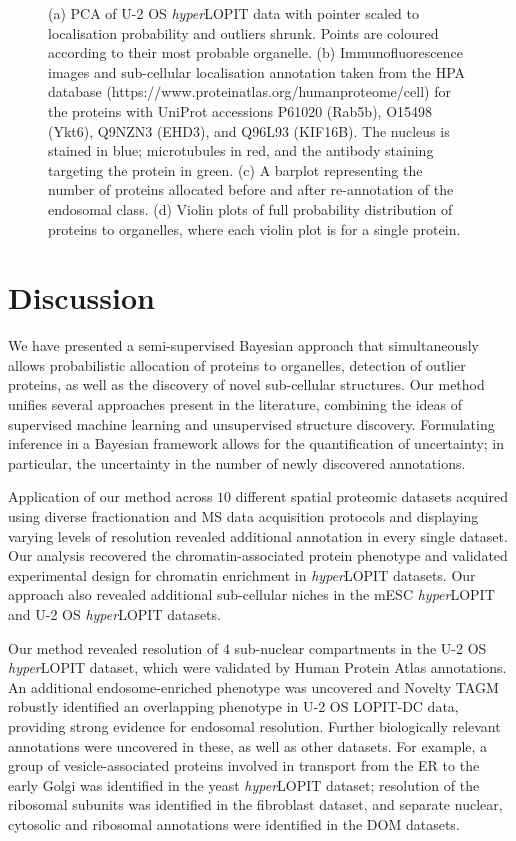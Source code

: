 \documentclass[12pt,english]{article}
\begin{document}
\begin{figure}[h]
\begin{subfigure}[t]{1\textwidth}
		\caption{}
	\end{subfigure}
	\caption{(a) PCA of U-2 OS \textit{hyper}LOPIT data with pointer scaled to localisation probability and outliers shrunk. Points are coloured according to their most probable organelle. (b) Immunofluorescence images and sub-cellular localisation annotation taken from the HPA database (https://www.proteinatlas.org/humanproteome/cell) for the proteins with UniProt accessions P61020 (Rab5b), O15498 (Ykt6), Q9NZN3 (EHD3), and Q96L93 (KIF16B). The nucleus is stained in blue; microtubules in red, and the antibody staining targeting the protein in green. (c) A barplot representing the number of proteins allocated before and after re-annotation of the endosomal class. (d) Violin plots of full probability distribution of proteins to organelles, where each violin plot is for a single protein.
	}
	\label{figure:u2os}
\end{figure}
\clearpage 
\section{Discussion}
We have presented a semi-supervised Bayesian approach that simultaneously allows probabilistic allocation of proteins to organelles, detection of outlier proteins, as well as the discovery of novel sub-cellular structures. Our method unifies several approaches present in the literature, combining the ideas of supervised machine learning and unsupervised structure discovery. Formulating inference in a Bayesian framework allows for the quantification of uncertainty; in particular, the uncertainty in the number of newly discovered annotations.

Application of our method across $10$ different spatial proteomic datasets acquired using diverse fractionation and MS data acquisition protocols and displaying varying levels of resolution revealed additional annotation in every single dataset. Our analysis recovered the chromatin-associated protein phenotype and validated experimental design for chromatin enrichment in \textit{hyper}LOPIT datasets. Our approach also revealed additional sub-cellular niches in the mESC \textit{hyper}LOPIT and U-2 OS \textit{hyper}LOPIT datasets.

Our method revealed resolution of $4$ sub-nuclear compartments in the U-2 OS \textit{hyper}LOPIT dataset, which were validated by Human Protein Atlas annotations. An additional endosome-enriched phenotype was uncovered and Novelty TAGM robustly identified an overlapping phenotype in U-2 OS LOPIT-DC data, providing strong evidence for endosomal resolution. Further biologically relevant annotations were uncovered in these, as well as other datasets. For example, a group of vesicle-associated proteins involved in transport from the ER to the early Golgi was identified in the yeast \textit{hyper}LOPIT dataset; resolution of the ribosomal subunits was identified in the fibroblast dataset, and separate nuclear, cytosolic and ribosomal annotations were identified in the DOM datasets.
\end{document}
